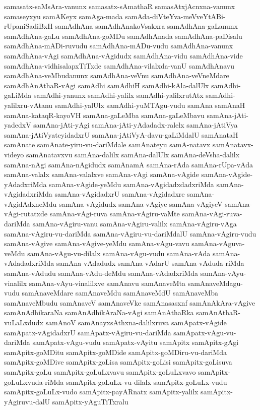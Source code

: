 {samasatx-saMsAra-vanunx
samasatx-sAmathaR
samasAtxjAcnxna-vanunx
samaseyxyu
samAKeyx
samAga-mada
samAda-diVteYva-meVveYtABi-rUpaniSadiBxH
samAdhAna
samAdhAnakoVsakxra
samAdhAna-gaLanunx
samAdhAna-gaLu
samAdhAna-goMDu
samAdhAnada
samAdhAna-paDisalu
samAdhAna-mADi-ruvudu
samAdhAna-mADu-vudu
samAdhAna-vanunx
samAdhAna-vAgi
samAdhAna-vAgidudx
samAdhAna-vidu
samAdhAna-vide
samAdhAna-vidhisalapxTiTxde
samAdhAna-vilalxda-vanU
samAdhAnavu
samAdhAna-veMbudanunx
samAdhAna-veVnu
samAdhAna-veVneMdare
samAdhAnAthaR-vAgi
samAdhi
samAdhiH
samAdhi-kAla-dalUlx
samAdhi-gaLiMda
samAdhi-yanunx
samAdhi-yalilx
samAdhi-yalilxrutAtx
samAdhi-yalilxru-vAtanu
samAdhi-yalUlx
samAdhi-yuMTAgu-vudu
samAna
samAnaH
samAna-kataqR-kayoVH
samAna-gaLeMba
samAna-gaLeMbavu
samAna-jAti-yadedxV
samAna-jAti-yAgi
samAna-jAti-yAdadadx-ralelx
samAna-jAtiVya
samAna-jAtiVyateyidadxrU
samAna-jAtiVyA-davu-gaLiMdalU
samAnataH
samAnate
samAnate-yiru-vu-dariMdale
samAnateyu
samA-natavx
samAnatavx-videyo
samAnatavxvu
samAna-dalilx
samAna-dalUlx
samAna-deVsha-dalilx
samAna-nAgi
samAna-nAgidudx
samAnamA
samAna-rAda
samAna-rUpa-vAda
samAna-valalx
samAna-valalxve
samAna-vAgi
samAna-vAgide
samAna-vAgide-yAdadxriMda
samAna-vAgide-yeMdu
samAna-vAgidadxdadxriMda
samAna-vAgidadxriMda
samAna-vAgidadxrU
samAna-vAgidadxre
samAna-vAgidAdxneMdu
samAna-vAgidudx
samAna-vAgiye
samAna-vAgiyeV
samAna-vAgi-rutatxde
samAna-vAgi-ruva
samAna-vAgiru-vaMte
samAna-vAgi-ruva-dariMda
samAna-vAgiru-vanu
samAna-vAgiru-valilx
samAna-vAgiru-vAga
samAna-vAgiru-vu-dariMda
samAna-vAgiru-vu-dariMdalU
samAna-vAgiru-vudu
samAna-vAgive
samAna-vAgive-yeMdu
samAna-vAgu-vavu
samAna-vAguva-veMdu
samAna-vAgu-vu-dilalx
samAna-vAgu-vudu
samAna-vAda
samAna-vAdadadxriMda
samAna-vAdadudx
samAna-vAdarU
samAna-vAduda-riMda
samAna-vAdudu
samAna-vAdu-deMdu
samAna-vAdadxriMda
samAna-vAyu-vinalilx
samAna-vAyu-vinalilxve
samAnavu
samAnaveMta
samAnaveMdagu-vudu
samAnaveMdare
samAnaveMdu
samAnaveMdU
samAnaveMba
samAnaveMbudu
samAnaveV
samAnaveVke
samAnasasxnf
samAnAkAra-vAgive
samAnAdhikaraNa
samAnAdhikAraNa-vAgi
samAnAthaRka
samAnAthaR-vuLaLxdudx
samAnoV
samAnayxsAthxna-dalilxruva
samApatx-vAgide
samApatx-vAgidadxrU
samApatx-vAgiru-vu-dariMda
samApatx-vAgu-vu-dariMda
samApatx-vAgu-vudu
samApatx-vAyitu
samApitx
samApitx-gAgi
samApitx-goMDitu
samApitx-goMDide
samApitx-goMDiru-vu-dariMda
samApitx-goMDive
samApitx-goLisa
samApitx-goLisi
samApitx-goLisuva
samApitx-goLu
samApitx-goLuLxvavu
samApitx-goLuLxvavo
samApitx-goLuLxvuda-riMda
samApitx-goLuLx-vu-dilalx
samApitx-goLuLx-vudu
samApitx-goLuLx-vudo
samApitx-payARnatx
samApitx-yalilx
samApitx-yAgiruvu-dalU
samApitx-yAguTiTxralu
}
